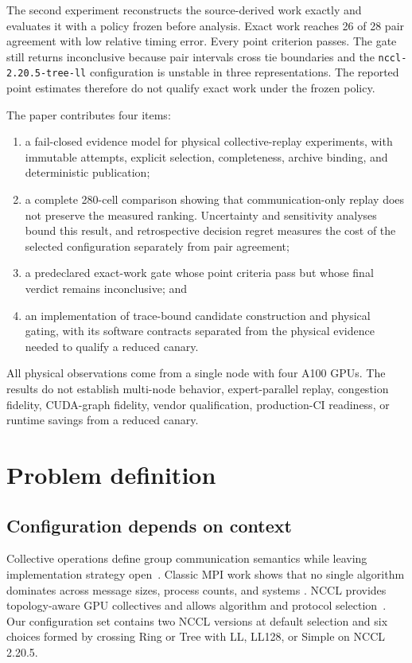 \documentclass[10pt,twocolumn]{article}
\begin{document}
The second experiment reconstructs the source-derived work exactly and
evaluates it with a policy frozen before analysis. Exact work reaches 26 of 28
pair agreement with low relative timing error. Every point criterion passes.
The gate still returns inconclusive because pair intervals cross tie boundaries
and the \texttt{nccl-2.20.5-tree-ll} configuration is unstable in three
representations. The reported point estimates therefore do not qualify exact
work under the frozen policy.

The paper contributes four items:

\begin{enumerate}
  \item a fail-closed evidence model for physical collective-replay experiments,
    with immutable attempts, explicit selection, completeness, archive binding,
    and deterministic publication;
  \item a complete 280-cell comparison showing that communication-only replay
    does not preserve the measured ranking. Uncertainty and sensitivity
    analyses bound this result, and retrospective decision regret measures
    the cost of the selected configuration separately from pair agreement;
  \item a predeclared exact-work gate whose point criteria pass but whose
    final verdict remains inconclusive; and
  \item an implementation of trace-bound candidate construction and physical
    gating, with its software contracts separated from the physical evidence
    needed to qualify a reduced canary.
\end{enumerate}

All physical observations come from a single node with four A100 GPUs. The
results do not establish multi-node behavior, expert-parallel replay,
congestion fidelity, CUDA-graph fidelity, vendor qualification, production-CI
readiness, or runtime savings from a reduced canary.

\section{Problem definition}

\subsection{Configuration depends on context}

Collective operations define group communication semantics while leaving
implementation strategy open~\cite{mpi}. Classic MPI work shows that no single
algorithm dominates across message sizes, process counts, and systems
\cite{thakur,vadhiyar}. NCCL provides topology-aware GPU collectives and allows
algorithm and protocol selection~\cite{nccl}. Our configuration set contains
two NCCL versions at default selection and six choices formed by crossing Ring
or Tree with LL, LL128, or Simple on NCCL 2.20.5.
\end{document}
